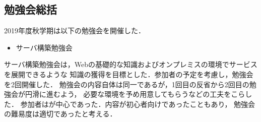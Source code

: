\subsection*{勉強会総括}


2019年度秋学期は以下の勉強会を開催した．
\begin{itemize}
    \item サーバ構築勉強会
\end{itemize}

サーバ構築勉強会は，Webの基礎的な知識およびオンプレミスの環境でサービスを展開できるような
知識の獲得を目標とした．参加者の予定を考慮し，勉強会を2回開催した．
勉強会の内容自体は同一であるが，1回目の反省から2回目の勉強会が円滑に進むよう，
必要な環境を予め用意してもらうなどの工夫をこらした．
参加者は\firstGrade{}が中心であった．内容が初心者向けであったこともあり，
勉強会の難易度は適切であったと考える．

